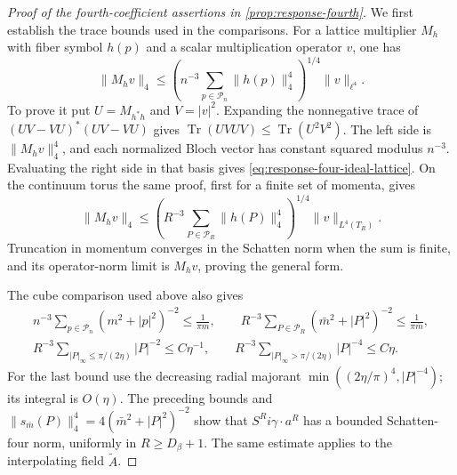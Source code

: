 \documentclass[11pt,letterpaper,reqno]{amsart}
\begin{document}
\begin{proof}[Proof of the fourth-coefficient assertions in \cref{prop:response-fourth}]
We first establish the trace bounds used in the comparisons.
For a lattice multiplier $M_h$ with fiber symbol $h(p)$
and a scalar multiplication operator $v$, one has
\begin{equation}\label{eq:response-four-ideal-lattice}
 \|M_hv\|_4\le
       \left(n^{-3}\sum_{p\in\mathcal P_n}\|h(p)\|_4^4\right)^{1/4}
                                         \|v\|_{\ell^4}.
\end{equation}
To prove it put $U=M_{h^*h}$ and $V=|v|^2$. Expanding the
nonnegative trace of $(UV-VU)^*(UV-VU)$ gives
$\operatorname{Tr}(UVUV)\le\operatorname{Tr}(U^2V^2)$.
The left side is $\|M_hv\|_4^4$, and each normalized
Bloch vector has constant squared modulus $n^{-3}$.
Evaluating the right side in that basis gives
\eqref{eq:response-four-ideal-lattice}. On the continuum
torus the same proof, first for a finite set of momenta,
gives
\begin{equation}\label{eq:response-four-ideal-torus}
 \|M_hv\|_4\le
       \left(R^{-3}\sum_{P\in\mathcal P_R}\|h(P)\|_4^4\right)^{1/4}
                                           \|v\|_{L^4(T_R)}.
\end{equation}
Truncation in momentum converges in the Schatten norm
when the sum is finite, and its operator-norm limit is
$M_hv$, proving the general form.

The cube comparison used above also gives
\begin{equation}\label{eq:response-four-momentum-sums}
 \begin{gathered}
 n^{-3}\sum_{p\in\mathcal P_n}(m^2+|p|^2)^{-2}\le\frac1{\pi m},
 \qquad
 R^{-3}\sum_{P\in\mathcal P_R}(\bar m^2+|P|^2)^{-2}
                                             \le\frac1{\pi\bar m},\\
 R^{-3}\sum_{|P|_\infty\le\pi/(2\eta)}|P|^{-2}\le C\eta^{-1},
 \qquad
 R^{-3}\sum_{|P|_\infty>\pi/(2\eta)}|P|^{-4}\le C\eta.
 \end{gathered}
\end{equation}
For the last bound use the decreasing radial majorant
$\min((2\eta/\pi)^4,|P|^{-4})$; its integral is $O(\eta)$.
The preceding bounds and
$\|s_{\bar m}(P)\|_4^4=4(\bar m^2+|P|^2)^{-2}$ show that
$S^Ri\gamma\cdot a^R$ has a bounded Schatten-four norm,
uniformly in $R\ge D_\beta+1$. The same estimate applies
to the interpolating field $\widetilde A$.


\end{proof}
\end{document}
